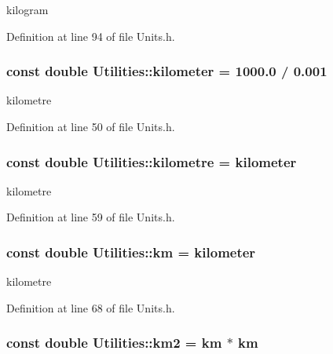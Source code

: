 kilogram 



Definition at line 94 of file Units.h.

\hypertarget{namespace_utilities_a06654149ce3cba96084c785b079a7a31}{
\subsubsection[{kilometer}]{\setlength{\rightskip}{0pt plus 5cm}const double {\bf Utilities::kilometer} = 1000.0 / 0.001}}
\label{namespace_utilities_a06654149ce3cba96084c785b079a7a31}


kilometre 



Definition at line 50 of file Units.h.

\hypertarget{namespace_utilities_ae059df9243c641262f7a72694479ab09}{
\subsubsection[{kilometre}]{\setlength{\rightskip}{0pt plus 5cm}const double {\bf Utilities::kilometre} = {\bf kilometer}}}
\label{namespace_utilities_ae059df9243c641262f7a72694479ab09}


kilometre 



Definition at line 59 of file Units.h.

\hypertarget{namespace_utilities_a4e01876aaa4c4d98bcbf9526e980d996}{
\subsubsection[{km}]{\setlength{\rightskip}{0pt plus 5cm}const double {\bf Utilities::km} = {\bf kilometer}}}
\label{namespace_utilities_a4e01876aaa4c4d98bcbf9526e980d996}


kilometre 



Definition at line 68 of file Units.h.

\hypertarget{namespace_utilities_a61a790dbfa282940ea38347f86885324}{
\subsubsection[{km2}]{\setlength{\rightskip}{0pt plus 5cm}const double {\bf Utilities::km2} = {\bf km} $\ast$ {\bf km}}}
\label{namespace_utilities_a61a790dbfa282940ea38347f86885324}


